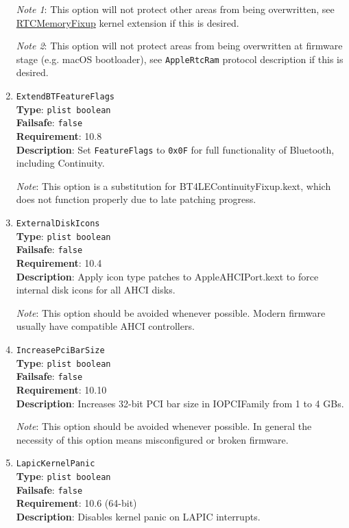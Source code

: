 \documentclass[]{article}
\begin{document}
\begin{enumerate}
  \emph{Note 1}: This option will not protect other areas from being overwritten,
  see \href{https://github.com/acidanthera/RTCMemoryFixup}{RTCMemoryFixup}
  kernel extension if this is desired.

  \emph{Note 2}: This option will not protect areas from being overwritten
  at firmware stage (e.g. macOS bootloader), see \texttt{AppleRtcRam} protocol
  description if this is desired.

\item
  \texttt{ExtendBTFeatureFlags}\\
  \textbf{Type}: \texttt{plist\ boolean}\\
  \textbf{Failsafe}: \texttt{false}\\
  \textbf{Requirement}: 10.8\\
  \textbf{Description}: Set \texttt{FeatureFlags} to \texttt{0x0F} for full
  functionality of Bluetooth, including Continuity.

  \emph{Note}: This option is a substitution for BT4LEContinuityFixup.kext,
  which does not function properly due to late patching progress.

\item
  \texttt{ExternalDiskIcons}\\
  \textbf{Type}: \texttt{plist\ boolean}\\
  \textbf{Failsafe}: \texttt{false}\\
  \textbf{Requirement}: 10.4\\
  \textbf{Description}: Apply icon type patches to AppleAHCIPort.kext to force
  internal disk icons for all AHCI disks.

  \emph{Note}: This option should be avoided whenever possible. Modern firmware
  usually have compatible AHCI controllers.

\item
  \texttt{IncreasePciBarSize}\\
  \textbf{Type}: \texttt{plist\ boolean}\\
  \textbf{Failsafe}: \texttt{false}\\
  \textbf{Requirement}: 10.10\\
  \textbf{Description}: Increases 32-bit PCI bar size in IOPCIFamily from 1 to 4 GBs.

  \emph{Note}: This option should be avoided whenever possible. In general the necessity
  of this option means misconfigured or broken firmware.

\item
  \texttt{LapicKernelPanic}\\
  \textbf{Type}: \texttt{plist\ boolean}\\
  \textbf{Failsafe}: \texttt{false}\\
  \textbf{Requirement}: 10.6 (64-bit)\\
  \textbf{Description}: Disables kernel panic on LAPIC interrupts.


\end{enumerate}
\end{document}
